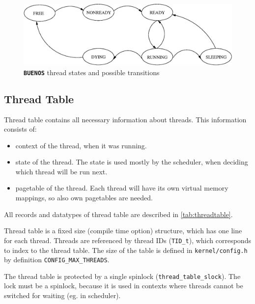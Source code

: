\documentclass[twoside,a4paper]{report}
\newlength{\tablewidth}
\newcommand{\buenos}{\texttt{\textbf{BUENOS}}}
\begin{document}
\begin{figure}
\begin{center}
\includegraphics[width=\tablewidth]{pics/thread_states.ps}
\caption{\buenos{} thread states and possible transitions}
\label{fig:thread_states}
\end{center}
\end{figure}

\subsection{Thread Table}
\label{sec:threadtable}


Thread table contains all necessary information about threads. This
information consists of:
\begin{itemize}
\item context of the thread, when it was running.
\item state of the thread. The state is used mostly by the scheduler,
when deciding which thread will be run next.
\item pagetable of the thread. Each thread will have its own virtual
memory mappings, so also own pagetables are needed.
\end{itemize}
All records and datatypes of thread table are described in
\autoref{tab:threadtable}.


Thread table is a fixed size (compile time option) structure, which
has one line for each thread. Threads are referenced by thread IDs
(\texttt{TID\_t}), which corresponds to index to the thread table. The
size of the table is defined in \texttt{kernel/config.h} by definition
\texttt{CONFIG\_MAX\_THREADS}. 


The thread table is protected by a single spinlock
(\texttt{thread\_table\_slock}). The lock must be a spinlock, because it
is used in contexts where threads cannot be switched for waiting (eg.
in scheduler). 
\end{document}

